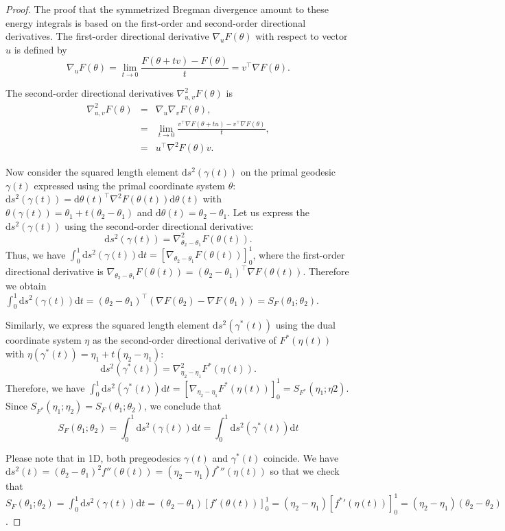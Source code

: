 \documentclass[entropy,article,accept,oneauthor,pdftex,entropy]{Definitions/mdpi}
\def\dtheta{\mathrm{d}\theta}
\def\dt{\mathrm{d}t}
\def\ds{\mathrm{d}s}
\begin{document}
\begin{proof}
The proof that the symmetrized Bregman divergence amount to these energy integrals
is based on the first-order and second-order directional derivatives.
The first-order directional derivative $\nabla_u F(\theta)$ with respect to vector $u$ is defined by 
$$
\nabla_u F(\theta)=\lim_{t\rightarrow 0} \frac{F(\theta+tv)-F(\theta)}{t}=v^\top \nabla F(\theta).
$$
 
The second-order directional derivatives $\nabla_{u,v}^2 F(\theta)$ is
\begin{eqnarray*}
\nabla_{u,v}^2 F(\theta) &=& \nabla_{u} \nabla_v F(\theta),\\
 &=& \lim_{t\rightarrow 0} \frac{v^\top \nabla F(\theta+tu)-v^\top\nabla F(\theta)}{t},\\
&=& u^\top \nabla^2 F(\theta) v.
\end{eqnarray*}


Now consider the squared length element $\ds^2(\gamma(t))$ on the primal geodesic $\gamma(t)$ expressed using the primal coordinate system $\theta$:
$\ds^2(\gamma(t))=\dtheta(t)^\top \nabla^2F(\theta(t)) \dtheta(t)$ with $\theta(\gamma(t))=\theta_1+t(\theta_2-\theta_1)$ and $\dtheta(t)=\theta_2-\theta_1$.
Let us express the $\ds^2(\gamma(t))$   using the second-order directional derivative:
$$
\ds^2(\gamma(t))=\nabla^2_{\theta_2-\theta_1}  F(\theta(t)).
$$
Thus, we have $\int_0^1 \ds^2(\gamma(t))\dt=[\nabla_{\theta_2-\theta_1}  F(\theta(t))]_0^1$,
where the first-order directional derivative is $\nabla_{\theta_2-\theta_1}  F(\theta(t))=(\theta_2-\theta_1)^\top \nabla F(\theta(t))$.
Therefore we obtain $\int_0^1 \ds^2(\gamma(t))\dt=(\theta_2-\theta_1)^\top (\nabla F(\theta_2)-\nabla F(\theta_1))=S_F(\theta_1;\theta_2)$.

Similarly, we express the squared length element $\ds^2(\gamma^*(t))$ using the dual coordinate system $\eta$ as the second-order directional derivative of $F^*(\eta(t))$ with $\eta(\gamma^*(t))=\eta_1+t(\eta_2-\eta_1)$:
$$
\ds^2(\gamma^*(t))=\nabla^2_{\eta_2-\eta_1}  F^*(\eta(t)).
$$
Therefore, we have  $\int_0^1 \ds^2(\gamma^*(t))\dt=[\nabla_{\eta_2-\eta_1}  F^*(\eta(t))]_0^1=S_{F^*}(\eta_1;\eta2)$.
Since $S_{F^*}(\eta_1;\eta_2)=S_F(\theta_1;\theta_2)$, we conclude that
$$
S_F(\theta_1;\theta_2)=\int_0^1 \ds^2(\gamma(t))\dt=\int_0^1 \ds^2(\gamma^*(t))\dt
$$

Please note that in 1D, both pregeodesics $\gamma(t)$ and $\gamma^*(t)$ coincide. We have $\ds^2(t)=(\theta_2-\theta_1)^2 f''(\theta(t))=(\eta_2-\eta_1){f^*}''(\eta(t))$ so that we check that $S_F(\theta_1;\theta_2)=\int_0^1 \ds^2(\gamma(t))\dt=(\theta_2-\theta_1)[f'(\theta(t))]_0^1=(\eta_2-\eta_1)[{f^*}'(\eta(t))]_0^1=(\eta_2-\eta_1)(\theta_2-\theta_2)$.
 \end{proof}
 
\end{document}
